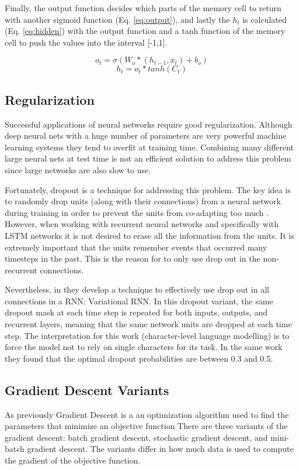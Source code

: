 Finally, the output function decides which parts of the memory cell to return with another sigmoid function (Eq. \ref{eq:output}), and lastly the $h_t$ is calculated (Eq. \ref{eq:hidden}) with the output function and a tanh function of the memory cell to push the values into the interval [-1,1].

\begin{equation} \label{eq:output}
o_t=\sigma(W_o*(h_{t-1},x_t)+b_o)
\end{equation}
\begin{equation} \label{eq:hidden}
h_t=o_t*tanh(C_t)
\end{equation}

\subsection{Regularization}

Successful applications of neural networks require good regularization. Although deep neural nets with a huge number of parameters are very powerful machine learning systems they tend to overfit at training time. Combining many different large neural nets at test time is not an efficient solution to address this problem since large networks are also slow to use. 

Fortunately, dropout is a technique for addressing this problem. The key idea is to randomly drop units (along with their connections) from a neural network during training in order to prevent the units from co-adapting too much \cite{srivastava2013improving}. However, when working with recurrent neural networks and specifically with LSTM networks it is not desired to erase all the information from the units. It is extremely important that the units remember events that occurred many timesteps in the past. This is the reason for \cite{zaremba2014recurrent} to only use drop out in the non-recurrent connections. 

Nevertheless, in \cite{gal2015theoretically} they develop a technique to effectively use drop out in all connections in a RNN: Variational RNN. In this dropout variant, the same dropout mask at each time step is repeated for both inputs, outputs, and recurrent layers, meaning that the same network units are dropped at each time step. The interpretation for this work (character-level language modelling) is to force the model not to rely on single characters for its task. In the same work they found that the optimal dropout
probabilities are between 0.3 and 0.5.

\subsection{Gradient Descent Variants}
As previously Gradient Descent is a an optimization algorithm used to find the parameters that minimize an objective function
There are three variants of the gradient descent: batch gradient descent, stochastic gradient descent, and mini-batch gradient descent. The variants differ in how much data is used to compute the gradient of the objective function. 

